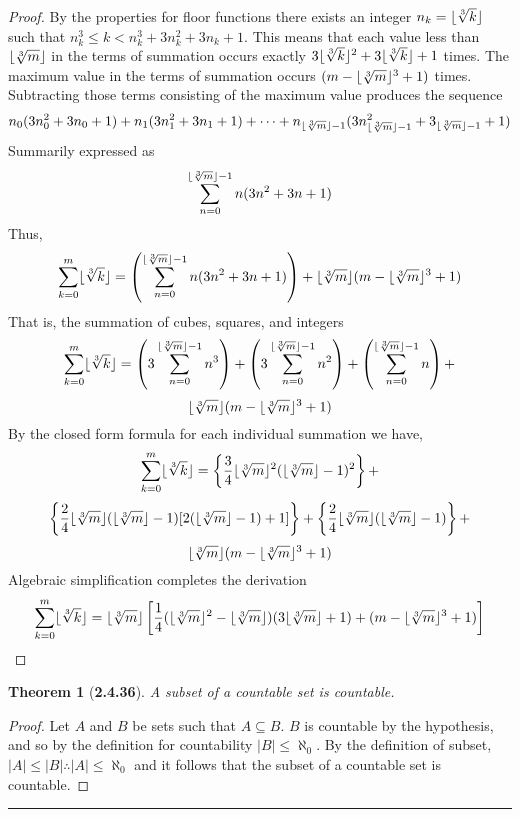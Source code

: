 \documentclass[a4paper, 12pt]{article}
\theoremstyle{plain}
\newtheorem*{theorem*}{Theorem}
\DeclarePairedDelimiter{\floor}{\lfloor}{\rfloor}
\begin{document}
\begin{proof}
    By the properties for floor functions there exists an integer $n_k = \floor{\sqrt[3]{k}}$ such 
    that $n_{k}^{3} \le k < n_{k}^{3} + 3n_{k}^{2} + 3n_k + 1$. This means that each value less 
    than $\floor{\sqrt[3]{m}}$ in the terms of summation occurs exactly 
    $3\floor{\sqrt[3]{k}}^{2} + 3\floor{\sqrt[3]{k}} + 1$ times. The maximum value in the terms of 
    summation occurs $(m - \floor{\sqrt[3]{m}}^{3} + 1)$ times. Subtracting those terms consisting 
    of the maximum value produces the sequence
    $$n_0(3n_{0}^{2} + 3n_0 + 1) + 
    n_1(3n_{1}^{2} + 3n_{1} + 1) + 
    \dots +
    n_{\floor{\sqrt[3]{m}} - 1}
    (3n_{\floor{\sqrt[3]{m}}-1}^{2} + 3_{\floor{\sqrt[3]{m}}-1} + 1)$$
    Summarily expressed as
    $$\sum_{n=0}^{\floor{\sqrt[3]{m}}-1} n(3n^2 + 3n + 1)$$
    Thus,
    $$\sum_{k=0}^{m} \floor{\sqrt[3]{k}} = 
    \left(\sum_{n=0}^{\floor{\sqrt[3]{m}}-1} n(3n^{2} + 3n + 1)\right) + 
    \floor{\sqrt[3]{m}}(m - \floor{\sqrt[3]{m}}^{3} + 1)$$ 
    That is, the summation of cubes, squares, and integers
    $$\sum_{k=0}^{m} \floor{\sqrt[3]{k}} =
    \left(3\sum_{n=0}^{\floor{\sqrt[3]{m}}-1} n^{3}\right) + 
    \left(3\sum_{n=0}^{\floor{\sqrt[3]{m}}-1} n^{2}\right) + 
    \left(\sum_{n=0}^{\floor{\sqrt[3]{m}}-1} n\right) +$$
    $$\floor{\sqrt[3]{m}}(m - \floor{\sqrt[3]{m}}^{3} + 1)$$
    By the closed form formula for each individual summation we have, 
    $$\sum_{k=0}^{m} \floor{\sqrt[3]{k}} = 
    \left\{\frac{3}{4}\floor{\sqrt[3]{m}}^{2}(\floor{\sqrt[3]{m}}-1)^{2}\right\} +$$
    $$\left\{
        \frac{2}{4}\floor{\sqrt[3]{m}}(\floor{\sqrt[3]{m}}-1)[2(\floor{\sqrt[3]{m}}-1) +1]
    \right\} +
    \left\{\frac{2}{4}\floor{\sqrt[3]{m}}(\floor{\sqrt[3]{m}}-1)\right\} +$$
    $$\floor{\sqrt[3]{m}}(m - \floor{\sqrt[3]{m}}^{3} + 1)$$
    Algebraic simplification completes the derivation
    $$\sum_{k=0}^{m} \floor{\sqrt[3]{k}} =
    \floor{\sqrt[3]{m}}
    \left[
        \frac{1}{4}(\floor{\sqrt[3]{m}}^{2} - \floor{\sqrt[3]{m}})
        (3\floor{\sqrt[3]{m}}+1)+(m - \floor{\sqrt[3]{m}}^{3} + 1)
    \right]$$
\end{proof}

\pagebreak


\begin{theorem*}[\textbf{2.4.36}]
    A subset of a countable set is countable.
\end{theorem*}

\begin{proof}
    Let $A$ and $B$ be sets such that $A \subseteq B$. $B$ is countable by the hypothesis, and 
    so by the definition for countability $|B| \le \aleph_0$. By the definition of subset, 
    $|A| \le |B| \therefore |A| \le \aleph_0$ and it follows that the subset of a countable set 
    is countable.
\end{proof}
\begin{center}
    \rule{5.4in}{1pt}
\end{center}
\end{document}
